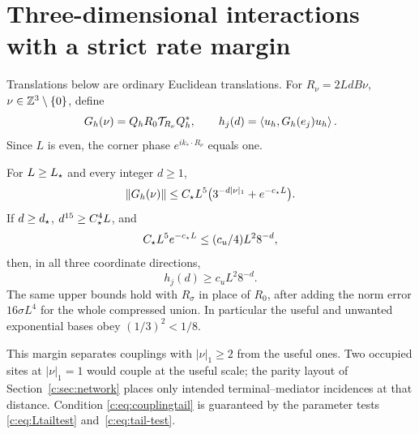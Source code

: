 \section{Three-dimensional interactions with a strict rate margin}
\label{c:sec:green}

Translations below are ordinary Euclidean translations. For
$R_\nu=2LdB\nu$, $\nu\in\mathbb Z^3\setminus\{0\}$, define
\[
 G_h(\nu)=Q_hR_0\mathcal T_{R_\nu}Q_h^*,\qquad
 h_j(d)=\left\langle u_h,G_h(e_j)u_h\right\rangle.
\]
Since $L$ is even, the corner phase $e^{ik_*\cdot R_\nu}$ equals one.

\begin{lemma}
\label{c:lem:interactions}
For $L\ge L_\star$ and every integer $d\ge1$,
\begin{equation}
 \left\lVert G_h(\nu)\right\rVert\le C_\star L^5
       \big(3^{-d|\nu|_1}+e^{-c_\star L}\big).              \label{c:eq:blockdecay}
\end{equation}
If $d\ge d_\star$, $d^{15}\ge C_\star^4L$, and
\begin{equation}
 C_\star L^5e^{-c_\star L}\le(c_u/4)L^2 8^{-d},              \label{c:eq:couplingtail}
\end{equation}
then, in all three coordinate directions,
\begin{equation}
 h_j(d)\ge c_uL^2 8^{-d}.                            \label{c:eq:couplinglower}
\end{equation}
The same upper bounds hold with $R_\sigma$ in place of $R_0$, after
adding the norm error $16\sigma L^4$ for the whole compressed union.
In particular the useful and unwanted exponential bases obey
$(1/3)^2<1/8$.
\end{lemma}
This margin separates couplings with $|\nu|_1\ge2$ from the useful ones.
Two occupied sites at $|\nu|_1=1$ would couple at the useful scale; the
parity layout of Section~\ref{c:sec:network} places only intended
terminal--mediator incidences at that distance. Condition
\eqref{c:eq:couplingtail} is guaranteed by the parameter tests
\eqref{c:eq:Ltailtest} and~\eqref{c:eq:tail-test}.

